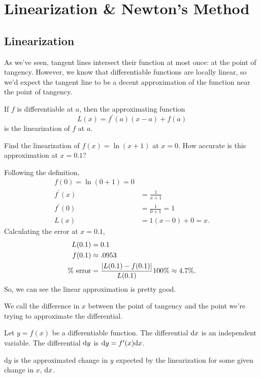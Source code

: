 \section{Linearization \& Newton's Method}

\subsection{Linearization}
As we've seen, tangent lines intersect their function at most once: at the point of tangency.
However, we know that differentiable functions are locally linear, so we'd expect the tangent line to be a decent approximation of the function near the point of tangency.

\begin{definition}
	If $f$ is differentiable at $a$, then the approximating function
	\begin{equation*}
		L(x) = f^\prime(a)(x-a) + f(a)
	\end{equation*}
	is the linearization of $f$ at $a$.
\end{definition}

\begin{example}
	Find the linearization of $f(x) = \ln{(x+1)}$ at $x=0$.
	How accurate is this approximation at $x=0.1$?
\end{example}
Following the definition,
\begin{align*}
	f(0) = \ln{(0+1)} = 0 \\
	f^\prime(x) &= \frac{1}{x+1} \\
	f^\prime(0) &= \frac{1}{0+1} = 1 \\
	L(x) &= 1(x-0) + 0 = x.
\end{align*}
\indent
Calculating the error at $x=0.1$,
\begin{align*} 
	L(0.1) &= 0.1 \\
	f(0.1) &\approx .0953 \\
	\text{\% error} &= \frac{\lvert L(0.1)-f(0.1) \rvert}{L(0.1)}100\text{\%} \approx 4.7\text{\%}.
\end{align*}
\indent
So, we can see the linear approximation is pretty good.

\noindent
We call the difference in $x$ between the point of tangency and the point we're trying to approximate the differential.
\begin{definition}
	Let $y=f(x)$ be a differentiable function.
	The differential $\mathrm{d} x$ is an independent variable.
	The differential $\mathrm{d} y$ is $\mathrm{d} y = f^\prime(x)\mathrm{d} x$.
\end{definition}
\noindent
$\mathrm{d}y$ is the approximated change in $y$ expected by the linearization for some given change in $x$, $\mathrm{d} x$.

